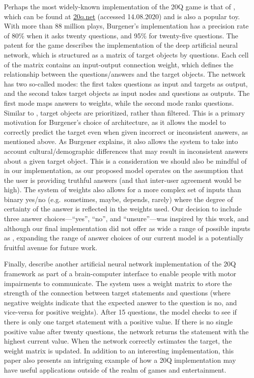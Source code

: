 \documentclass[11pt,a4paper]{article}
\begin{document}
Perhaps the most widely-known implementation of the 20Q game is that of \citet{Burgener2006}, which can be found at \url{20q.net} (accessed 14.08.2020) and is also a popular toy. 
With more than 88 million plays, Burgener's implementation has a precision rate of 80\% when it asks twenty questions, and 95\% for twenty-five questions. 
The patent for the game describes the implementation of the deep artificial neural network, which is structured as a matrix of target objects by questions. 
Each cell of the matrix contains an input-output connection weight, which defines the relationship between the questions/answers and the target objects. 
The network has two so-called modes: the first takes questions as input and targets as output, and the second takes target objects as input nodes and questions as outputs. 
The first mode maps answers to weights, while the second mode ranks questions. 
Similar to \citet{DeyEa2019}, target objects are prioritized, rather than filtered. 
This is a primary motivation for Burgener's choice of architecture, as it allows the model to correctly predict the target even when given incorrect or inconsistent answers, as mentioned above. 
As Burgener explains, it also allows the system to take into account cultural/demographic differences that may result in inconsistent answers about a given target object. 
This is a consideration we should also be mindful of in our implementation, as our proposed model operates on the assumption that the user is providing truthful answers (and that inter-user agreement would be high). 
The system of weights also allows for a more complex set of inputs than binary yes/no (e.g.\ sometimes, maybe, depends, rarely) where the degree of certainty of the answer is reflected in the weights used. 
Our decision to include three answer choices---``yes'', ``no'', and ``unsure''---was inspired by this work, and although our final implementation did not offer as wide a range of possible inputs as \citet{Burgener2006}, expanding the range of answer choices of our current model is a potentially fruitful avenue for future work.

Finally, \citet{ToninEa2018} describe another artificial neural network implementation of the 20Q framework as part of a brain-computer interface to enable people with motor impairments to communicate. 
The system uses a weight matrix to store the strength of the connection between target statements and questions (where negative weights indicate that the expected answer to the question is no, and vice-versa for positive weights). 
After 15 questions, the model checks to see if there is only one target statement with a positive value. 
If there is no single positive value after twenty questions, the network returns the statement with the highest current value. 
When the network correctly estimates the target, the weight matrix is updated. 
In addition to an interesting implementation, this paper also presents an intriguing example of how a 20Q implementation may have useful applications outside of the realm of games and entertainment.
\end{document}
